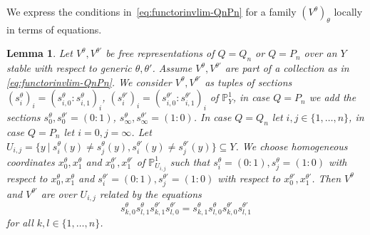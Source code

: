 \documentclass[10pt,a4paper]{amsart}
\newtheorem{lemma}[theo]{Lemma}
\theoremstyle{definition}
\def\P{\mathds P}
\begin{document}
We express the conditions in~\eqref{eq:functorinvlim-QnPn} for a family 
$(V^\theta)_\theta$ locally in terms of equations.

\begin{lemma}\label{le:eq-invlimit}
Let $V^\theta,V^{\theta'}$ be free representations of $Q=Q_n$ or $Q=P_n$ over an %
{} $Y$ stable with respect to generic $\theta,\theta'$. 
Assume $V^\theta,V^{\theta'}$ are part of a collection as in 
\eqref{eq:functorinvlim-QnPn}. 
We consider $V^\theta,V^{\theta'}$ as tuples of sections 
$(s^\theta_i)_i=(s^\theta_{i,0}:s^\theta_{i,1})_i$, 
$(s^{\theta'}_i)_i=(s^{\theta'}_{i,0}:s^{\theta'}_{i,1})_i$ of $\P^1_Y$, 
in case $Q=P_n$ we add the sections $s^\theta_0,s^{\theta'}_0=(0:1)$,
$s^\theta_\infty,s^{\theta'}_\infty=(1:0)$.
In case $Q=Q_n$ let $i,j\in\{1,\ldots,n\}$, in case $Q=P_n$ let $i=0,j=\infty$.
Let $U_{i,j}=\{y\:|\:s^\theta_i(y)\neq s^\theta_j(y),
s^{\theta'}_i(y)\neq s^{\theta'}_j(y)\}\subseteq Y$.
We choose homogeneous coordinates $x^\theta_0,x^\theta_1$ and 
$x^{\theta'}_0,x^{\theta'}_1$ of $\P^1_{U_{i,j}}$ 
such that $s^\theta_i=(0:1),s^\theta_j=(1:0)$ with respect to $x^\theta_0,x^\theta_1$
and $s^{\theta'}_i=(0:1), s^{\theta'}_j=(1:0)$ with respect to $x^{\theta'}_0,x^{\theta'}_1$. 
Then $V^\theta$ and $V^{\theta'}$ are over $U_{i,j}$ related by the equations
\begin{equation}\label{eq:theta-theta'}
s^\theta_{k,0}s^\theta_{l,1}s^{\theta'}_{k,1}s^{\theta'}_{l,0}
=s^\theta_{k,1}s^\theta_{l,0}s^{\theta'}_{k,0}s^{\theta'}_{l,1}
\end{equation}
for all $k,l\in\{1,\ldots,n\}$.
\end{lemma}
\end{document}
